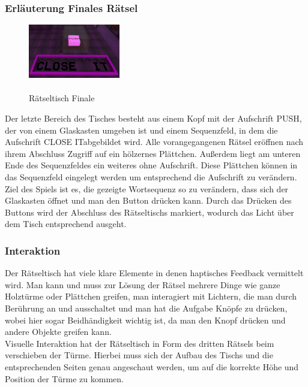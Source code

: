 \subsubsection{Erläuterung Finales Rätsel}
\begin{figure}
	\vspace*{-0.7cm}
	\includegraphics[width=4cm]{Pictures/Tisch4}
	\caption{\\ \noindent Rätseltisch Finale}
	\vspace*{-0.2cm}
	\label{fig:tisch4}
\end{figure}
Der letzte Bereich des Tisches besteht aus einem Kopf mit der Aufschrift \dq PUSH\dq, der von einem Glaskasten umgeben ist und einem Sequenzfeld, in dem die Aufschrift \dq CLOSE  IT\dq abgebildet wird. Alle vorangegangenen Rätsel eröffnen nach ihrem Abschluss Zugriff auf ein hölzernes Plättchen. Außerdem liegt am unteren Ende des Sequenzfeldes ein weiteres ohne Aufschrift. Diese Plättchen können in das Sequenzfeld eingelegt werden um entsprechend die Aufschrift zu verändern. Ziel des Spiels ist es, die gezeigte Wortsequenz so zu verändern, dass sich der Glaskasten öffnet und man den Button drücken kann. Durch das Drücken des Buttons wird der Abschluss des Rätseltischs markiert, wodurch das Licht über dem Tisch entsprechend ausgeht. 

\subsubsection{Interaktion}
Der Rätseltisch hat viele klare Elemente in denen haptisches Feedback vermittelt wird. Man kann und muss zur Lösung der Rätsel mehrere Dinge wie ganze Holztürme oder Plättchen greifen, man interagiert mit Lichtern, die man durch Berührung an und ausschaltet und man hat die Aufgabe Knöpfe zu drücken, wobei hier sogar Beidhändigkeit wichtig ist, da man den Knopf drücken und andere Objekte greifen kann.\\

\noindent Visuelle Interaktion hat der Rätseltisch in Form des dritten Rätsels beim verschieben der Türme. Hierbei muss sich der Aufbau des Tischs und die entsprechenden Seiten genau angeschaut werden, um auf die korrekte Höhe und Position der Türme zu kommen.\\


